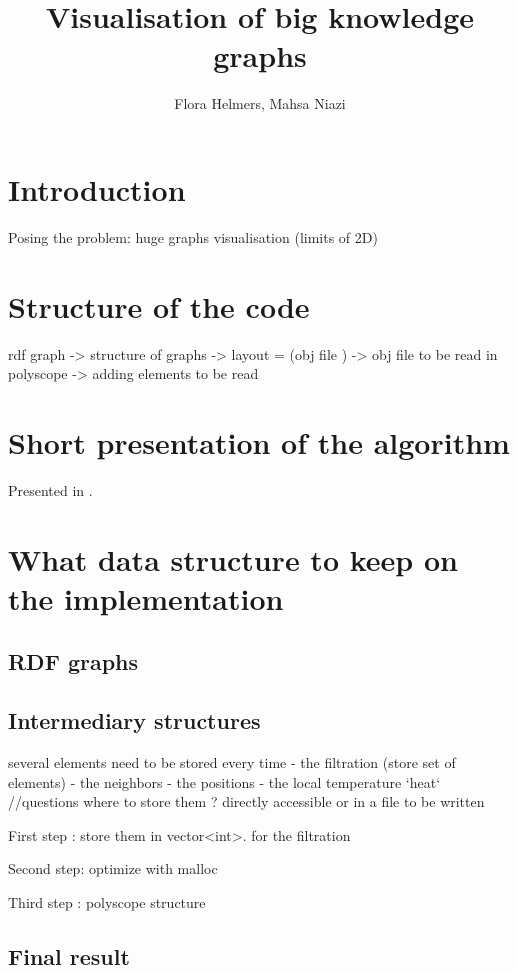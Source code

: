 \documentclass{article}
\title{Visualisation of big knowledge graphs}
\author{Flora Helmers, Mahsa Niazi}
\begin{document}
\maketitle

\section*{Introduction}
Posing the problem:
huge graphs 
visualisation (limits of 2D)


\section{Structure of the code}
rdf graph
-> 
structure of graphs
-> 
layout = (obj file )
-> 
obj file to be read in polyscope
-> 
adding elements to be read 

\section{Short presentation of the algorithm}
Presented in \cite{gajer00}. 

\section{What data structure to keep on the implementation}
\subsection{RDF  graphs}

\subsection{Intermediary structures}
several elements need to be stored every time 
- the filtration (store set of elements)
- the neighbors
- the positions 
- the local temperature `heat` 
//questions where to store them ? directly accessible or in a file to be written

First step : store them in vector<int>. 
    for the filtration

Second step: optimize with malloc

Third step : polyscope structure 


\subsection{Final result}


\printbibliography[
heading=bibintoc,
title={Bibliography}
]
\end{document}
